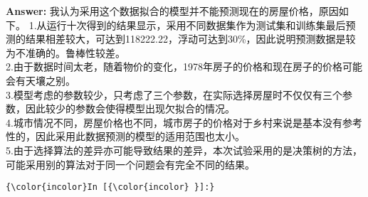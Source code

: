 \documentclass{article}
\begin{document}
    \textbf{Answer: }
我认为采用这个数据拟合的模型并不能预测现在的房屋价格，原因如下。
1.从运行十次得到的结果显示，采用不同数据集作为测试集和训练集最后预测的结果相差较大，可达到118222.22，浮动可达到30\%，因此说明预测数据是较为不准确的。鲁棒性较差。\\
2.由于数据时间太老，随着物价的变化，1978年房子的价格和现在房子的价格可能会有天壤之别。\\
3.模型考虑的参数较少，只考虑了三个参数，在实际选择房屋时不仅仅有三个参数，因此较少的参数会使得模型出现欠拟合的情况。\\
4.城市情况不同，房屋价格也不同，城市房子的价格对于乡村来说是基本没有参考性的，因此采用此数据预测的模型的适用范围也太小。\\
5.由于选择算法的差异亦可能导致结果的差异，本次试验采用的是决策树的方法，可能采用别的算法对于同一个问题会有完全不同的结果。

    \begin{Verbatim}[commandchars=\\\{\}]
{\color{incolor}In [{\color{incolor} }]:} 
\end{Verbatim}


    
    
    
    
\end{document}
